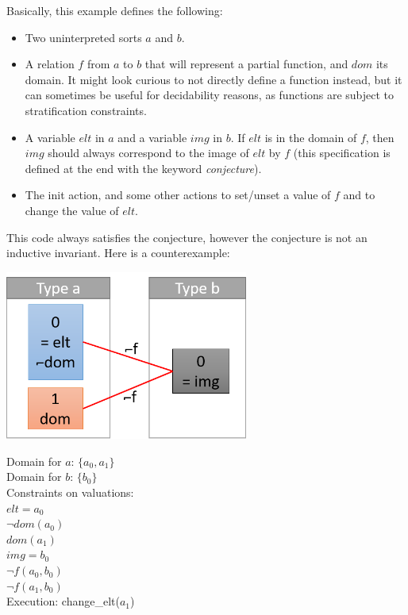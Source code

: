 \documentclass[11pt,a4paper,oldfontcommands,openany]{memoir}
\begin{document}
    Basically, this example defines the following:
    \begin{itemize}
        \item Two uninterpreted sorts \(a\) and \(b\).
        \item A relation \(f\) from \(a\) to \(b\) that will represent a partial function, and \(dom\) its domain. It might look curious to not directly define a function instead,
        but it can sometimes be useful for decidability reasons, as functions are subject to stratification constraints.
        \item A variable \(elt\) in \(a\) and a variable \(img\) in \(b\). If \(elt\) is in the domain of \(f\), then \(img\) should always
        correspond to the image of \(elt\) by \(f\) (this specification is defined at the end with the keyword \textit{conjecture}).
        \item The init action, and some other actions to set/unset a value of \(f\) and to change the value of \(elt\).
    \end{itemize}

    This code always satisfies the conjecture, however the conjecture is not an inductive invariant. Here is a counterexample:\\

    \begin{minipage}{0.45\textwidth}
        \includegraphics[width=8cm]{NonMonotonicExCounterexample}
    \end{minipage} \hfill
    \begin{minipage}{0.45\textwidth}
        Domain for \(a\): \(\{a_0,a_1\}\)\\
        Domain for \(b\): \(\{b_0\}\)\\
        Constraints on valuations:\\
        \(elt = a_0\)\\
        \(\neg dom(a_0)\)\\
        \(dom(a_1)\)\\
        \(img = b_0\)\\
        \(\neg f(a_0,b_0)\)\\
        \(\neg f(a_1,b_0)\)\\
        Execution: change_elt(\(a_1\))
    \end{minipage}\\
\end{document}
